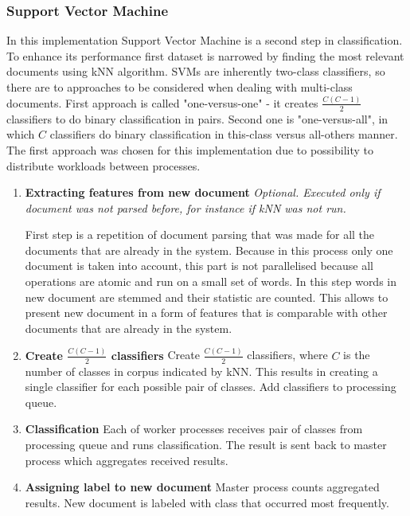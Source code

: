 \subsubsection{Support Vector Machine} \label{methodology:svm}
In this implementation Support Vector Machine is a second step in classification. To enhance its performance first dataset is narrowed by finding the most relevant documents using kNN algorithm. SVMs are inherently two-class classifiers, so there are to approaches to be considered when dealing with multi-class documents. First approach is called "one-versus-one" - it creates \(\frac{C (C-1)}{2}\) classifiers to do binary classification in pairs. Second one is "one-versus-all", in which \(C\) classifiers do binary classification in this-class versus all-others manner. The first approach was chosen for this implementation due to possibility to distribute workloads between processes.

\begin{enumerate}
		\item \textbf{Extracting features from new document}\newline
		\textit{Optional. Executed only if document was not parsed before, for instance if kNN was not run.}
		
		First step is a repetition of document parsing that was made for all the documents that are already in the system. Because in this process only one document is taken into account, this part is not parallelised because all operations are atomic and run on a small set of words. In this step words in new document are stemmed and their statistic are counted. This allows to present new document in a form of features that is comparable with other documents that are already in the system.
		
		\item \textbf{Create \(\frac{C (C-1)}{2}\) classifiers}\newline
		Create \(\frac{C (C-1)}{2}\) classifiers, where \(C\) is the number of classes in corpus indicated by kNN. This results in creating a single classifier for each possible pair of classes. Add classifiers to processing queue.
		
		\item \textbf{Classification}\newline
		Each of worker processes receives pair of classes from processing queue and runs classification. The result is sent back to master process which aggregates received results.
		
		\item \textbf{Assigning label to new document}\newline 
		Master process counts aggregated results. New document is labeled with class that occurred most frequently.
		
\end{enumerate}

